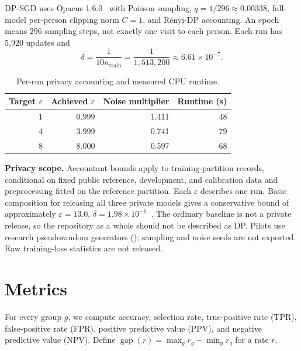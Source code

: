 \documentclass[11pt,letterpaper]{article}
\newcommand{\eps}{\varepsilon}
\newcommand{\code}[1]{\texttt{\detokenize{#1}}}
\begin{document}
DP-SGD uses Opacus 1.6.0~\cite{opacus} with Poisson sampling, $q=1/296\approx0.00338$, full-model per-person clipping norm $C=1$, and R\'enyi-DP accounting. An epoch means 296 sampling steps, not exactly one visit to each person. Each run has 5,920 updates and
\[
\delta=\frac{1}{10n_{\mathrm{train}}}
       =\frac{1}{1{,}513{,}200}\approx6.61\times10^{-7}.
\]
\begin{table}[H]
\centering\small
\begin{tabular}{rrrr}\toprule
Target $\eps$ & Achieved $\eps$ & Noise multiplier & Runtime (s)\\\midrule
1 & 0.999 & 1.411 & 48\\
4 & 3.999 & 0.741 & 79\\
8 & 8.000 & 0.597 & 68\\\bottomrule
\end{tabular}
\caption{Per-run privacy accounting and measured CPU runtime.}\label{tab:privacy}
\end{table}

\textbf{Privacy scope.} Accountant bounds apply to training-partition records, conditional on fixed public reference, development, and calibration data and preprocessing fitted on the reference partition. Each $\eps$ describes one run. Basic composition for releasing all three private models gives a conservative bound of approximately $\eps=13.0$, $\delta=1.98\times10^{-6}$~\cite{dwork2014}. The ordinary baseline is not a private release, so the repository as a whole should not be described as DP. Pilots use research pseudorandom generators (\code{secure_mode = False}); sampling and noise seeds are not exported. Raw training-loss statistics are not released.

\section{Metrics}
For every group $g$, we compute accuracy, selection rate, true-positive rate (TPR), false-positive rate (FPR), positive predictive value (PPV), and negative predictive value (NPV). Define $\operatorname{gap}(r)=\max_g r_g-\min_g r_g$ for a rate $r$.
\end{document}

